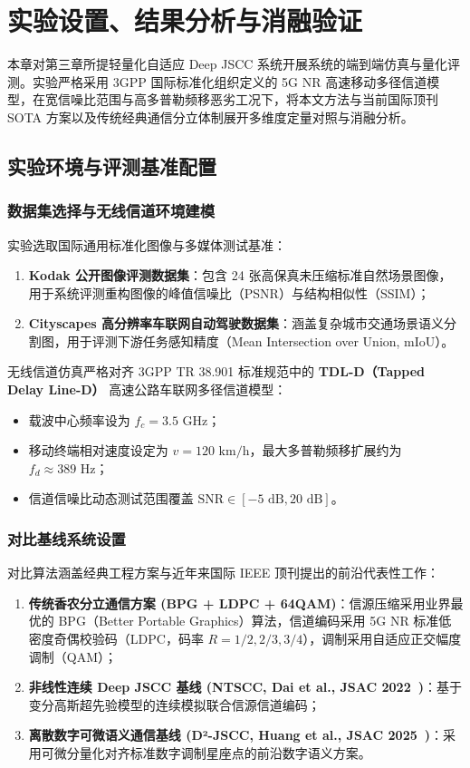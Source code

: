 \chapter{实验设置、结果分析与消融验证}
\label{chap:experiments}

本章对第三章所提轻量化自适应 Deep JSCC 系统开展系统的端到端仿真与量化评测。实验严格采用 3GPP 国际标准化组织定义的 5G NR 高速移动多径信道模型，在宽信噪比范围与高多普勒频移恶劣工况下，将本文方法与当前国际顶刊 SOTA 方案以及传统经典通信分立体制展开多维度定量对照与消融分析。

\section{实验环境与评测基准配置}

\subsection{数据集选择与无线信道环境建模}
实验选取国际通用标准化图像与多媒体测试基准：
\begin{enumerate}
  \item \textbf{Kodak 公开图像评测数据集}：包含 24 张高保真未压缩标准自然场景图像，用于系统评测重构图像的峰值信噪比（PSNR）与结构相似性（SSIM）；
  \item \textbf{Cityscapes 高分辨率车联网自动驾驶数据集}：涵盖复杂城市交通场景语义分割图，用于评测下游任务感知精度（Mean Intersection over Union, mIoU）。
\end{enumerate}

无线信道仿真严格对齐 3GPP TR 38.901 标准规范中的 \textbf{TDL-D（Tapped Delay Line-D）} 高速公路车联网多径信道模型：
\begin{itemize}
  \item 载波中心频率设为 $f_c = 3.5\text{ GHz}$；
  \item 移动终端相对速度设定为 $v = 120\text{ km/h}$，最大多普勒频移扩展约为 $f_d \approx 389\text{ Hz}$；
  \item 信道信噪比动态测试范围覆盖 $\text{SNR} \in [-5\text{ dB}, 20\text{ dB}]$。
\end{itemize}

\subsection{对比基线系统设置}
对比算法涵盖经典工程方案与近年来国际 IEEE 顶刊提出的前沿代表性工作：
\begin{enumerate}
  \item \textbf{传统香农分立通信方案 (BPG + LDPC + 64QAM)}：信源压缩采用业界最优的 BPG（Better Portable Graphics）算法，信道编码采用 5G NR 标准低密度奇偶校验码（LDPC，码率 $R = 1/2, 2/3, 3/4$），调制采用自适应正交幅度调制（QAM）；
  \item \textbf{非线性连续 Deep JSCC 基线 (NTSCC, Dai et al., JSAC 2022~\cite{dai2022nonlinear})}：基于变分高斯超先验模型的连续模拟联合信源信道编码；
  \item \textbf{离散数字可微语义通信基线 (D²-JSCC, Huang et al., JSAC 2025~\cite{huang2025d2})}：采用可微分量化对齐标准数字调制星座点的前沿数字语义方案。
\end{enumerate}

